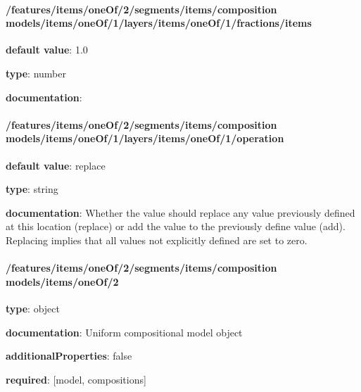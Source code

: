\begin{itemized}
\paragraph{/features/items/oneOf/2/segments/items/composition models/items/oneOf/1/layers/items/oneOf/1/fractions/items} \begin{itemized}
\item {\bf default value}: 1.0
\item {\bf type}: number
\item {\bf documentation}: 
\end{itemized}\end{itemized}\paragraph{/features/items/oneOf/2/segments/items/composition models/items/oneOf/1/layers/items/oneOf/1/operation} \begin{itemized}
\item {\bf default value}: replace
\item {\bf type}: string
\item {\bf documentation}: Whether the value should replace any value previously defined at this location (replace) or add the value to the previously define value (add). Replacing implies that all values not explicitly defined are set to zero.
\end{itemized}\paragraph{/features/items/oneOf/2/segments/items/composition models/items/oneOf/2} \begin{itemized}
\item {\bf type}: object
\item {\bf documentation}: Uniform compositional model object
\item {\bf additionalProperties}: false
\item {\bf required}: [model, compositions]\end{itemized}

